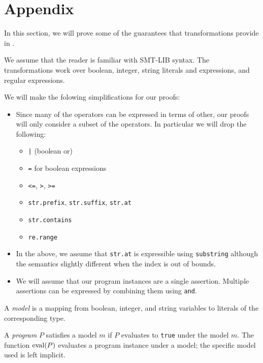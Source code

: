 \section{Appendix}

In this section, we will prove some of the guarantees that transformations
provide in \fuzzer{}.

We assume that the reader is familiar with SMT-LIB syntax. The transformations
work over boolean, integer, string literals and expressions, and regular
expressions.

We will make the folowing simplifications for our proofs:
\begin{itemize}
  \item
    Since many of the operators can be expressed in terms of other, our
    proofs will only consider a subset of the operators. In particular we will
    drop the following:
    \begin{itemize}
      \item \texttt{|} (boolean or)
      \item \texttt{=} for boolean expressions
      \item \texttt{<=}, \texttt{>}, \texttt{>=}
      \item \texttt{str.prefix}, \texttt{str.suffix}, \texttt{str.at}
      \item \texttt{str.contains}
      \item \texttt{re.range}
    \end{itemize}

  \item
    In the above, we assume that \texttt{str.at} is expressible using
    \texttt{substring} although the semantics slightly different when the index
    is out of bounds.

  \item
    We will assume that our program instances are a single assertion. Multiple
    assertions can be expressed by combining them using \texttt{and}.
\end{itemize}

\begin{definition}
  A \emph{model} is a mapping from boolean, integer, and string variables to
literals of the corresponding type.
\end{definition}

\begin{definition}
  A \emph{program} $P$ satisfies a model $m$ if $P$ evaluates to \texttt{true}
under the model $m$. The function $\operatorname{eval} (P)$ evaluates a program instance
under a model; the specific model used is left implicit.
\end{definition}

